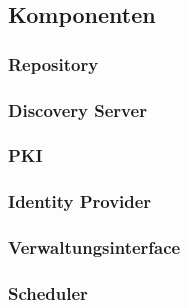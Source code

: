 \subsection{Komponenten}

\subsubsection{Repository}
\subsubsection{Discovery Server}
\subsubsection{\ac{PKI}}
\subsubsection{Identity Provider}
\subsubsection{Verwaltungsinterface}
\subsubsection{Scheduler}